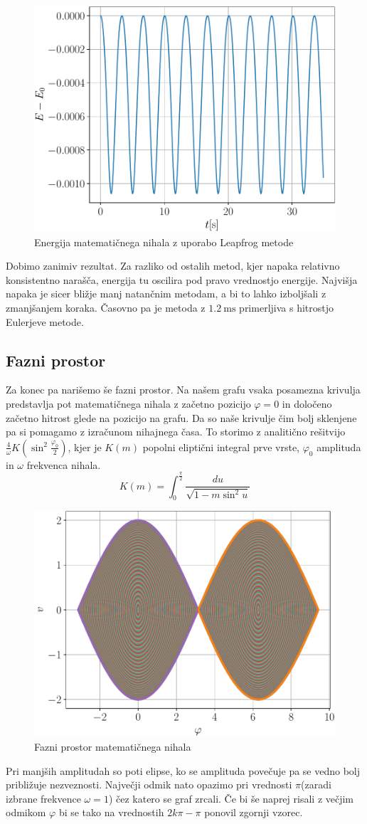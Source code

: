 \documentclass{article}
\begin{document}
\begin{figure}[H]
	\centering
	\includegraphics[width=0.7\linewidth]{leapfrog.pdf}
	\caption{Energija matematičnega nihala z uporabo Leapfrog metode}
\end{figure}
Dobimo zanimiv rezultat. Za razliko od ostalih metod, kjer napaka relativno konsistentno narašča, energija tu oscilira pod pravo vrednostjo energije. Najvišja napaka je sicer bližje manj natančnim metodam, a bi to lahko izboljšali z zmanjšanjem koraka. Časovno pa je metoda z $\SI{1.2}{\milli\second}$ primerljiva s hitrostjo Eulerjeve metode.
\subsection{Fazni prostor}
Za konec pa narišemo še fazni prostor. Na našem grafu vsaka posamezna krivulja predstavlja pot matematičnega nihala z začetno pozicijo $\varphi=0$ in določeno začetno hitrost glede na pozicijo na grafu. Da so naše krivulje čim bolj sklenjene pa si pomagamo z izračunom nihajnega časa. To storimo z analitično rešitvijo $\frac{4}{\omega}K\left(\sin^2{\frac{\varphi_0}{2}}\right)$, kjer je $K(m)$ popolni eliptični integral prve vrste, $\varphi_0$ amplituda in $\omega$ frekvenca nihala.
\begin{equation*}
	K(m) = \int_0^{\frac{\pi}{2}}\frac{du}{\sqrt{1 - m\sin^2{u}}}
\end{equation*}

\begin{figure}[H]
	\centering
	\includegraphics[width=0.7\linewidth]{phase.pdf}
	\caption{Fazni prostor matematičnega nihala}
\end{figure}
Pri manjših amplitudah so poti elipse, ko se amplituda povečuje pa se vedno bolj približuje nezveznosti. Največji odmik nato opazimo pri vrednosti $\pi$(zaradi izbrane frekvence $\omega=1$) čez katero se graf zrcali. Če bi še naprej risali z večjim odmikom $\varphi$ bi se tako na vrednostih $2k\pi - \pi$ ponovil zgornji vzorec. 
\end{document}
